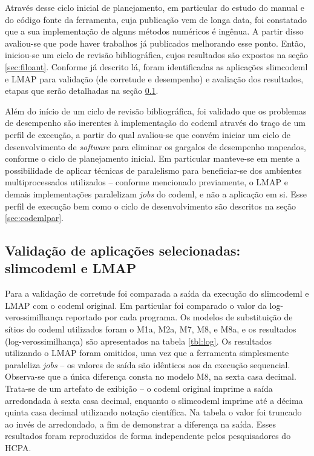 \documentclass[cic,tc]{iiufrgs}
\begin{document}
Através desse ciclo inicial de planejamento, em particular do estudo do manual
e do código fonte da ferramenta, cuja publicação vem de longa data, foi
constatado que a sua implementação de alguns métodos numéricos é ingênua. A
partir disso avaliou-se que pode haver trabalhos já publicados melhorando esse
ponto. Então, iniciou-se um ciclo de revisão bibliográfica, cujos resultados
são expostos na seção \ref{sec:filoant}. Conforme já descrito lá, foram
identificadas as aplicações slimcodeml e LMAP para validação (de corretude e
desempenho) e avaliação dos resultados, etapas que serão detalhadas na seção
\ref{sec:slimeval}.

Além do início de um ciclo de revisão bibliográfica, foi validado que os
problemas de desempenho são inerentes à implementação do codeml através do
traço de um perfil de execução, a partir do qual avaliou-se que convém iniciar
um ciclo de desenvolvimento de \textit{software} para eliminar os gargalos de
desempenho mapeados, conforme o ciclo de planejamento inicial. Em particular
manteve-se em mente a possibilidade de aplicar técnicas de paralelismo para
beneficiar-se dos ambientes multiprocessados utilizados -- conforme mencionado
previamente, o LMAP e demais implementações paralelizam \textit{jobs} do
codeml, e não a aplicação em si. Esse perfil de execução bem como o ciclo de
desenvolvimento são descritos na seção \ref{sec:codemlpar}.

\subsection{Validação de aplicações selecionadas: slimcodeml e LMAP}
\label{sec:slimeval}

Para a validação de corretude foi comparada a saída da execução do slimcodeml e
LMAP com o codeml original. Em particular foi comparado o valor da
log-verossimilhança reportado por cada programa. Os modelos de substituição de
sítios do codeml utilizados foram o M1a, M2a, M7, M8, e M8a, e os resultados
(log-verossimilhança) são apresentados na tabela \ref{tbl:log}. Os resultados
utilizando o LMAP foram omitidos, uma vez que a ferramenta simplesmente
paraleliza \textit{jobs} -- os valores de saída são idênticos aos da execução
sequencial. Observa-se que a única diferença consta no modelo M8, na sexta casa
decimal. Trata-se de um artefato de exibição -- o codeml original imprime a
saída arredondada à sexta casa decimal, enquanto o slimcodeml imprime até a
décima quinta casa decimal utilizando notação científica. Na tabela o valor foi
truncado ao invés de arredondado, a fim de demonstrar a diferença na saída.
Esses resultados foram reproduzidos de forma independente pelos pesquisadores
do HCPA.
\end{document}
